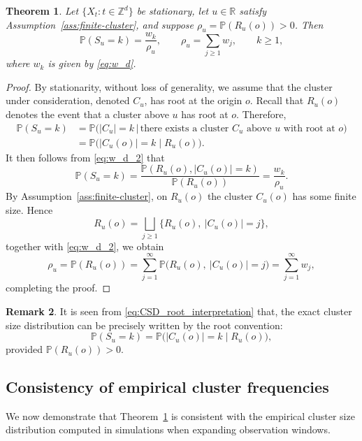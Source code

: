 \documentclass[aap,preprint]{imsart}
\theoremstyle{plain}
\newtheorem{theorem}{Theorem}[section]
\theoremstyle{definition}
\newtheorem{remark}[theorem]{Remark}
\def\R{{\mathbb R}}
\def\P{{\mathbb P}}
\def\Z{{\mathbb Z}}
\begin{document}
	\begin{theorem}\label{thm:CSD_d}
		Let $\{X_t:t\in\Z^d\}$ be stationary, let $u\in\R$ satisfy
		Assumption~\ref{ass:finite-cluster}, and suppose
		$\rho_u=\P(R_u(o))>0$.  Then
		\begin{equation}\label{eq:CSD_d}
			\P(S_u=k)=\frac{w_k}{\rho_u},
			\qquad
			\rho_u=\sum_{j\geq1}w_j,
			\qquad k\geq1,
		\end{equation}
		where $w_k$ is given by \eqref{eq:w_d}.
	\end{theorem}
	
	\begin{proof}
		By stationarity, without loss of generality, we assume that the cluster under consideration, denoted $C_u$, has root at the origin $o$. Recall that $R_u(o)$ denotes the event that a cluster above $u$ has root at $o$. Therefore,
		\begin{equation}\label{eq:CSD_root_interpretation}
			\begin{split}
				\P(S_u=k)
				&= \P\bigl(|C_u|=k \,\big|\, \text{there exists a cluster $C_u$ above $u$ with root at $o$}\bigr)\\
				&= \P\bigl(|C_u(o)|=k\mid R_u(o)\bigr).
			\end{split}
		\end{equation}
		It then follows from
		\eqref{eq:w_d_2} that
		\[
		\P(S_u=k)
		=\frac{\P(R_u(o),|C_u(o)|=k)}{\P(R_u(o))}
		=\frac{w_k}{\rho_u}.
		\]
		By Assumption~\ref{ass:finite-cluster}, on $R_u(o)$ the cluster $C_u(o)$ has some finite size.  Hence
		\[
		R_u(o)=\bigsqcup_{j\ge1}
		\{R_u(o),\ |C_u(o)|=j\},
		\]
		together with \eqref{eq:w_d_2}, we obtain
		\[
		\rho_u = \P(R_u(o)) = \sum_{j=1}^\infty \P\bigl(R_u(o),\ |C_u(o)|=j\bigr) = \sum_{j=1}^\infty w_j,
		\]
		completing the proof.
	\end{proof}
	
	\begin{remark}
		It is seen from \eqref{eq:CSD_root_interpretation} that, the exact cluster size distribution can be precisely written by the
		root convention:
		\begin{equation*}
			\P(S_u=k) = \P\bigl(|C_u(o)|=k\mid R_u(o)\bigr),
		\end{equation*}
		provided $\P(R_u(o))>0$.
	\end{remark}
	
	\subsection{Consistency of empirical cluster frequencies}
	\label{sec:empirical-cluster-counts}
	We now demonstrate that Theorem~\ref{thm:CSD_d} is consistent with the empirical cluster size distribution computed in simulations when expanding observation windows.
	
\end{document}
